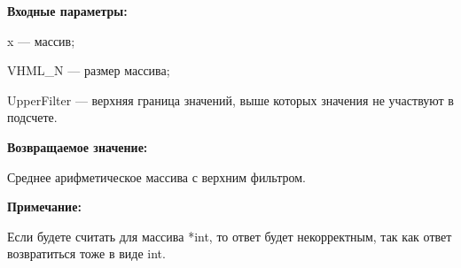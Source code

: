 \textbf{Входные параметры:}

 x --- массив;
 
 VHML\_N --- размер массива;
 
 UpperFilter --- верхняя граница значений, выше которых значения не участвуют в подсчете.

\textbf{Возвращаемое значение:}

 Среднее арифметическое массива с верхним фильтром.
 
\textbf{Примечание:}

Если будете считать для массива *int, то ответ будет некорректным, так как ответ возвратиться тоже в виде int.
 

